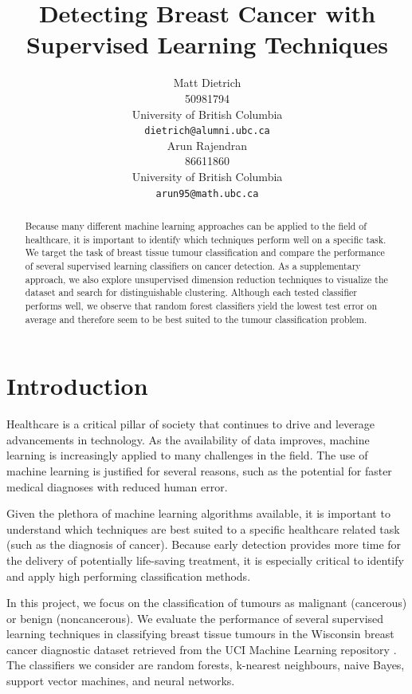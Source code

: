 \documentclass{article}
\title{Detecting Breast Cancer with Supervised Learning Techniques}
\author{%
  Matt Dietrich \\
  50981794 \\
  University of British Columbia \\
  \texttt{dietrich@alumni.ubc.ca} \\
  \And
  Arun Rajendran \\
  86611860 \\
  University of British Columbia \\
  \texttt{arun95@math.ubc.ca} \\
}
\begin{document}

\maketitle

\begin{abstract}
  Because many different machine learning approaches can be applied to the field of healthcare, it is important to identify which techniques perform well on a specific task. We target the task of breast tissue tumour classification and compare the performance of several supervised learning classifiers on cancer detection. As a supplementary approach, we also explore unsupervised dimension reduction techniques to visualize the dataset and search for distinguishable clustering. Although each tested classifier performs well, we observe that random forest classifiers yield the lowest test error on average and therefore seem to be best suited to the tumour classification problem.
\end{abstract}

\section{Introduction}


Healthcare is a critical pillar of society that continues to drive and leverage advancements in technology. As the availability of data improves, machine learning is increasingly applied to many challenges in the field. The use of machine learning is justified for several reasons, such as the potential for faster medical diagnoses with reduced human error.


Given the plethora of machine learning algorithms available, it is important to understand which techniques are best suited to a specific healthcare related task (such as the diagnosis of cancer). Because early detection provides more time for the delivery of potentially life-saving treatment, it is especially critical to identify and apply high performing classification methods.


In this project, we focus on the classification of tumours as malignant (cancerous) or benign (noncancerous). We evaluate the performance of several supervised learning techniques in classifying breast tissue tumours in the Wisconsin breast cancer diagnostic dataset retrieved from the UCI Machine Learning repository \cite{uci2017}. The classifiers we consider are random forests, k-nearest neighbours, naive Bayes, support vector machines, and neural networks. 
\end{document}

